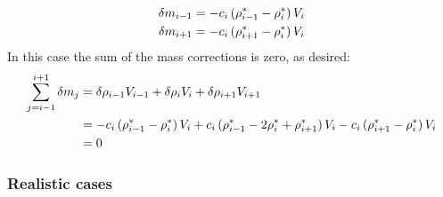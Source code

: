 \begin{align}
\delta m_{i-1} &= - c_i \, (\rho_{i-1}^* - \rho_i^*) \, V_i \notag\\
\delta m_{i+1} &= - c_i \, (\rho_{i+1}^* - \rho_i^*) \, V_i \notag
\end{align}
In this case the sum of the mass corrections is zero, as desired:
\begin{align}
\sum_{j=i-1}^{i+1} \delta m_j &= \delta \rho_{i-1} V_{i-1} + \delta \rho_i V_i + \delta \rho_{i+1}V_{i+1} \notag\\
&= - c_i \, (\rho_{i-1}^* - \rho_i^*) \, V_i + c_i \, (\rho_{i-1}^* - 2 \rho_i^* + \rho_{i+1}^*) \, V_i - c_i \, (\rho_{i+1}^* - \rho_i^*) \, V_i \notag\\
&= 0 \notag
\end{align}

\subsubsection*{Realistic cases}

